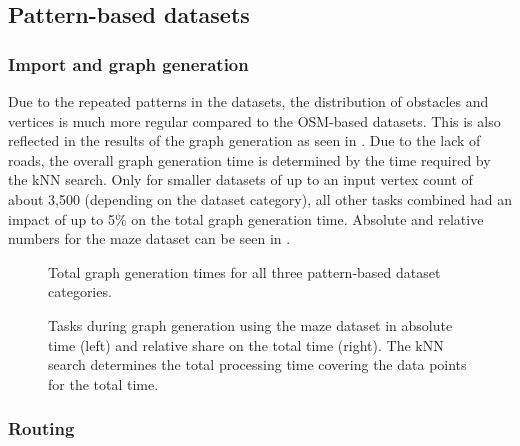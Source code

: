 	\subsection{Pattern-based datasets}
	
		\subsubsection{Import and graph generation}
		
			Due to the repeated patterns in the datasets, the distribution of obstacles and vertices is much more regular compared to the OSM-based datasets.
			This is also reflected in the results of the graph generation as seen in .
			Due to the lack of roads, the overall graph generation time is determined by the time required by the kNN search.
			Only for smaller datasets of up to an input vertex count of about 3,500 (depending on the dataset category), all other tasks combined had an impact of up to 5\% on the total graph generation time.
			Absolute and relative numbers for the maze dataset can be seen in .
			
			\begin{figure}[h!]
				\begin{figcenter}
					
				\end{figcenter}
				\caption{Total graph generation times for all three pattern-based dataset categories.}
				\label{fig:eval-import-pattern-abs}
			\end{figure}
			
			\begin{figure}[h!]
				\begin{figcenter}
					
				\end{figcenter}
				\caption{Tasks during graph generation using the maze dataset in absolute time (left) and relative share on the total time (right). The kNN search determines the total processing time covering the data points for the total time.}
				\label{fig:eval-import-pattern-maze-abs-rel}
			\end{figure}
		
		\subsubsection{Routing}
		
